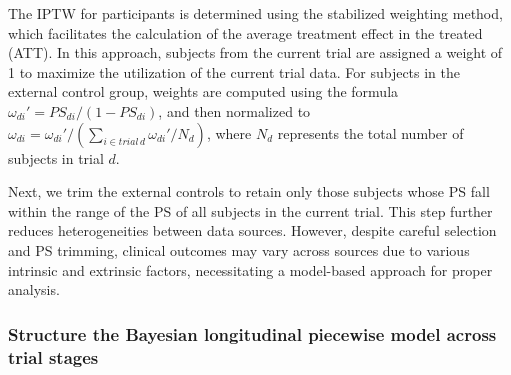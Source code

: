 The \ac{IPTW} for participants is determined using the stabilized weighting method, which facilitates the calculation of the average treatment effect in the treated (ATT). In this approach, subjects from the current trial are assigned a weight of 1 to maximize the utilization of the current trial data. For subjects in the external control group, weights are computed using the formula $\omega_{di}' = PS_{di} / (1 - PS_{di})$, and then normalized to $\omega_{di} = \omega_{di}' / (\sum_{i \in trial\, d} \omega_{di}' / N_{d})$, where $N_d$ represents the total number of subjects in trial $d$.

Next, we trim the external controls to retain only those subjects whose \ac{PS} fall within the range of the \ac{PS} of all subjects in the current trial. This step further reduces heterogeneities between data sources. However, despite careful selection and \ac{PS} trimming, clinical outcomes may vary across sources due to various intrinsic and extrinsic factors, necessitating a model-based approach for proper analysis.

\subsubsection{Structure the Bayesian longitudinal piecewise model across trial stages}

